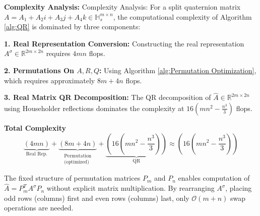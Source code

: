 \documentclass[12pt]{article}
\numberwithin{equation}{section} %
\begin{document}
\textbf{Complexity Analysis:}
{Complexity Analysis:} For a split quaternion matrix \(A = A_1 + A_2i + A_3j + A_4k \in \mathbb{H}_s^{m \times n}\), the computational complexity of Algorithm \ref{alg:QR} is dominated by three components:  

\textbf{1. Real Representation Conversion:}
Constructing the real representation \(A^\sigma \in \mathbb{R}^{2m \times 2n}\) requires  \(4mn\) flops. 

\textbf{2. Permutations On $A, R, Q$:}
Using Algorithm \ref{alg:Permutation Optimization}, which requires approximately \(8m+4n\) flops.


\textbf{3. Real Matrix QR Decomposition:}
The QR decomposition of \(\hat{A} \in \mathbb{R}^{2m \times 2n}\) using Householder reflections dominates the complexity at \(16(mn^2-\frac{n^3}{3})\) flops.

\textbf{Total Complexity}
$$
\underbrace{(4mn)}_{\text{Real Rep.}} + \underbrace{(8m+4n)}_{\substack{\text{Permutation} \\ \text{(optimized)}}} + \underbrace{(16(mn^2-\frac{n^3}{3}))}_{\text{QR}} \approx \boxed{(16(mn^2-\frac{n^3}{3}))}
$$  

\iffalse The fixed structure of permutation matrices \(P_m\) and \(P_n\) enables computation of \(\hat{A} = P_m^T A^\sigma P_n\) without explicit matrix multiplication.
By rearranging $A^\sigma$, placing odd rows (columns) first and even rows (columns) last, only $\mathcal{O}(m+n)$ swap operations are needed.
\end{document}
